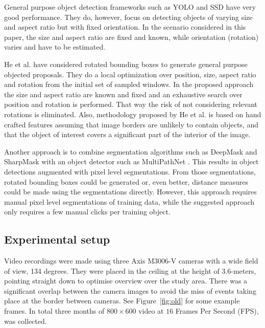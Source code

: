 \documentclass{cta-author}
\begin{document}
General purpose object detection frameworks such as YOLO \cite{DBLP:journals/corr/RedmonDGF15,redmon2016yolo9000} and SSD \cite{liu2016ssd} have very good performance. They do, however, focus on detecting objects of varying size and aspect ratio but with fixed orientation. In the scenario considered in this paper, the size and aspect ratio are fixed and known, while orientation (rotation) varies and have to be estimated. 

He et al. \cite{He_2015_ICCV} have considered rotated bounding boxes to generate general purpose objected proposals. They do a local optimization over position, size, aspect ratio and rotation from the initial set of sampled windows. In the proposed approach the size and aspect ratio are known and fixed and an exhaustive search over position and rotation is performed. That way the risk of not considering relevant rotations is eliminated. Also, methodology proposed by He et al. \cite{He_2015_ICCV}  is based on hand crafted features assuming that image borders are unlikely to contain objects, and that the object of interest covers a significant part of the interior of the image.

Another approach is to combine segmentation algorithms such as
DeepMask \cite{DBLP:journals/corr/PinheiroCD15} and
SharpMask \cite{DBLP:journals/corr/PinheiroLCD16} with an object detector such as 
MultiPathNet \cite{DBLP:journals/corr/ZagoruykoLLPGCD16}. This results in object detections augmented with pixel level segmentations. From those segmentations, rotated bounding boxes could be generated or, even better, distance measures could be made using the segmentations directly. However, this approach requires manual pixel level segmentations of training data, while the suggested approach only requires a few manual clicks per training object.

\subsection{Experimental setup}


Video recordings were made using three Axis M3006-V cameras with a wide field of view, 134 degrees. They were placed in the ceiling at the height of $3.6$-meters, pointing straight down to optimise overview over the study area. There was a significant overlap between the camera images to avoid the miss of events taking place at the border between cameras. See Figure~\ref{fig:old} for some example frames. In total three months of $800 \times 600$ video at $16$ Frames Per Second (FPS), was collected.
\end{document}
